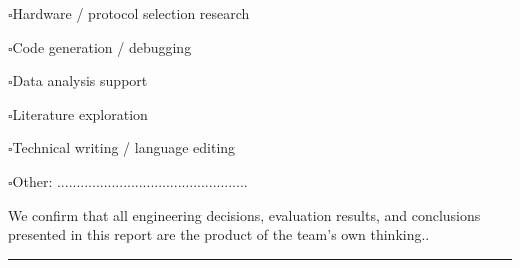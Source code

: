 \documentclass[conference,onecolumn]{IEEEtran}
\newcommand{\uncheckedbox}{$\square$}
\newcommand{\checkedbox}{\rlap{$\checkmark$}$\square$}
\begin{document}
\vspace{4pt}
\noindent\hspace*{2.5em}\uncheckedbox\enspace Hardware / protocol selection research

\vspace{4pt}
\noindent\hspace*{2.5em}\checkedbox\enspace Code generation / debugging

\vspace{4pt}
\noindent\hspace*{2.5em}\checkedbox\enspace Data analysis support

\vspace{4pt}
\noindent\hspace*{2.5em}\uncheckedbox\enspace Literature exploration

\vspace{4pt}
\noindent\hspace*{2.5em}\checkedbox\enspace Technical writing / language editing

\vspace{4pt}
\noindent\hspace*{2.5em}\uncheckedbox\enspace Other: .................................................

\vspace{10pt}
\noindent We confirm that all engineering decisions, evaluation results, and conclusions presented in this report are the product of the team's own thinking..

\vspace{6pt}
\noindent\rule{\textwidth}{0.6pt}
\end{document}
